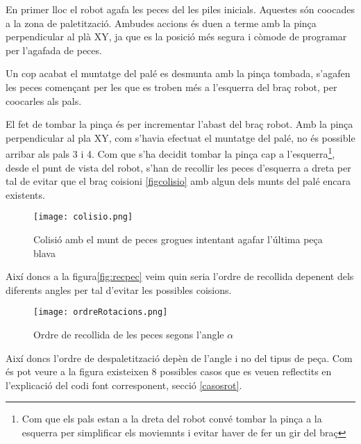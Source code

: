 En primer lloc el robot agafa les peces del les piles inicials.
Aquestes són co\lgem ocades a la zona de paletització. Ambudes
accions és duen a terme amb la pinça perpendicular al plà XY, ja que es la
posició més segura i còmode de programar per l'agafada de peces.

Un cop acabat el muntatge del palé es desmunta amb la pinça tombada,
s'agafen les peces començant per les que es
troben més a l'esquerra del braç robot, per co\lgem ocarles als pals.

El fet de tombar la pinça és per incrementar l'abast del braç robot. Amb la
pinça perpendicular al pla XY, com s'havia efectuat el muntatge del palé, no
és possible arribar als pals 3 i 4. Com que s'ha decidit tombar la pinça
cap a l'esquerra\footnote{Com que els pals estan a la dreta del robot convé
tombar la pinça a la esquerra per simplificar els moviemnts i evitar haver
de fer un gir del braç}, desde el punt de vista del robot, s'han de recollir
les peces d'esquerra a dreta per tal de evitar que el braç co\lgem isioni
\ref{figcolisio} amb algun dels munts del palé encara existents.

\begin{figure}[H]
\begin{center}
 \texttt{[image: colisio.png]}
\end{center}
  \caption{Colisió amb el munt de peces grogues intentant agafar l'última peça blava}
\end{figure}\label{figcolisio}

Així doncs a la figura\ref{fig:recpec}
veim quin seria l'ordre de recollida depenent dels diferents angles per tal
d'evitar les possibles co\lgem isions.

\begin{figure}[H]
\begin{center}\label{figrecpec}
 \texttt{[image: ordreRotacions.png]}
\end{center}
  \caption{Ordre de recollida de les peces segons l'angle $\alpha$}
\end{figure}

Així doncs l'ordre de despaletització depèn de l'angle i no del tipus de peça.
Com és pot veure a la figura existeixen 8 possibles casos que es veuen
reflectits en l'explicació del codi font corresponent, secció \ref{casosrot}.